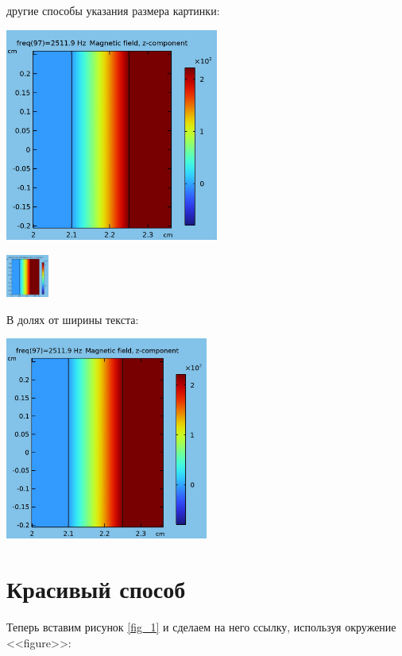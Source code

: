 \documentclass[a4paper, 12pt]{article}
\begin{document}
другие способы указания размера картинки:


\includegraphics[width=7cm]{09_out_img.png}

\includegraphics[height=40pt]{09_out_img.png}

В долях от ширины текста:

\includegraphics[width=0.5\textwidth]{09_out_img.png}

\newpage

\section{Красивый способ}
Теперь вставим рисунок \ref{fig_1} и сделаем на него ссылку, используя окружение <<figure>>:
\end{document}
